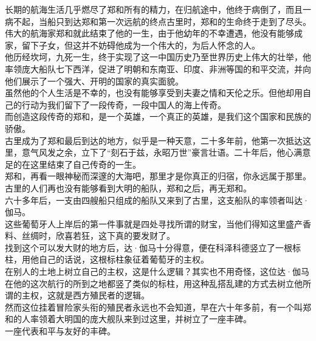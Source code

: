 \begin{multicols}{\theparacolNo}
长期的航海生活几乎燃尽了郑和所有的精力，在归航途中，他终于病倒了，而且一病不起，当船只到达郑和第一次远航的终点古里时，郑和的生命终于走到了尽头。\\

伟大的航海家郑和就此结束了他的一生，由于他幼年的不幸遭遇，他没有能够成家，留下子女，但这并不妨碍他成为一个伟大的，为后人怀念的人。\\

他历经坎坷，九死一生，终于实现了这一中国历史乃至世界历史上伟大的壮举，他率领庞大船队七下西洋，促进了明朝和东南亚、印度、非洲等国的和平交流，并向他们展示了一个强大、开明的国家的真实面貌。\\

虽然他的个人生活是不幸的，也没有能够享受到夫妻之情和天伦之乐。但他却用自己的行动为我们留下了一段传奇，一段中国人的海上传奇。\\

而创造这段传奇的郑和，是一个英雄，一个真正的英雄，是我们这个国家和民族的骄傲。\\

古里成为了郑和最后到达的地方，似乎是一种天意，二十多年前，他第一次抵达这里，意气风发之余，立下了“刻石于兹，永昭万世”豪言壮语。二十年后，他心满意足的在这里结束了自己传奇的一生。\\

郑和，再看一眼神秘而深邃的大海吧，那里才是你真正的归宿，你永远属于那里。\\

古里的人们再也没有能够看到大明的船队，郑和之后，再无郑和。\\

六十多年后，一支由四艘船只组成的船队又来到了古里，这支船队的率领者叫达·伽马。\\

这些葡萄牙人上岸后的第一件事就是四处寻找所谓的财宝，当他们得知这里盛产香料、丝绸时，欣喜若狂，这下真的要发财了。\\

找到这个可以发大财的地方后，达·伽马十分得意，便在科泽科德竖立了一根标柱，用他自己的话说，这根标柱象征着葡萄牙的主权。\\

在别人的土地上树立自己的主权，这是什么逻辑？其实也不用奇怪，这位达·伽马在他的这次航行的所到之地都竖了类似的标柱，用这种乱搭乱建的方式去树立他所谓的主权，这就是西方殖民者的逻辑。\\

然而这位挂着冒险家头衔的殖民者永远也不会知道，早在六十年多前，有一个叫郑和的人率领着大明国的庞大舰队来到过这里，并树立了一座丰碑。\\

一座代表和平与友好的丰碑。\\
\ifnum{}
	\end{multicols}
\fi
\newpage
